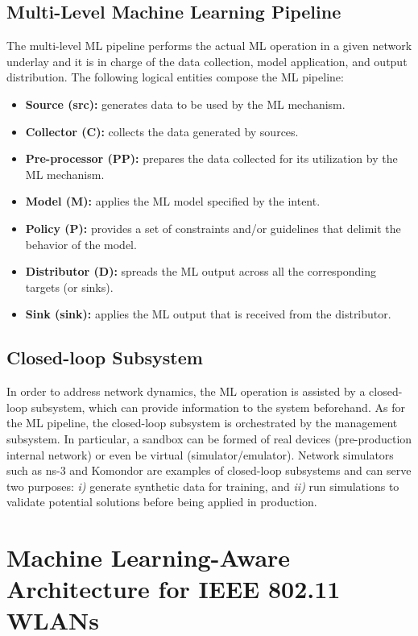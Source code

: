 \documentclass[journal]{IEEEtran}
\begin{document}
\subsection{Multi-Level Machine Learning Pipeline} 
The multi-level ML pipeline performs the actual ML operation in a given network underlay and it is in charge of the data collection, model application, and output distribution. The following logical entities compose the ML pipeline:
\begin{itemize}
	\item \textbf{Source (src):} generates data to be used by the ML mechanism.
	\item \textbf{Collector (C):} collects the data generated by sources.
	\item \textbf{Pre-processor (PP):} prepares the data collected for its utilization by the ML mechanism.
	\item \textbf{Model (M):} applies the ML model specified by the intent.
	\item \textbf{Policy (P):} provides a set of constraints and/or guidelines that delimit the behavior of the model.
	\item \textbf{Distributor (D):} spreads the ML output across all the corresponding targets (or sinks).
	\item \textbf{Sink (sink):} applies the ML output that is received from the distributor.
\end{itemize}

\subsection{Closed-loop Subsystem} 
In order to address network dynamics, the ML operation is assisted by a closed-loop subsystem, which can provide information to the system beforehand. As for the ML pipeline, the closed-loop subsystem is orchestrated by the management subsystem. In particular, a sandbox can be formed of real devices (pre-production internal network) or even be virtual (simulator/emulator). Network simulators such as ns-3 and Komondor \cite{barrachina2019komondor} are examples of closed-loop subsystems and can serve two purposes: \emph{i)} generate synthetic data for training, and \emph{ii)} run simulations to validate potential solutions before being applied in production.

\section{Machine Learning-Aware Architecture for IEEE 802.11 WLANs}
\label{section:wlans_architecture}
\end{document}
